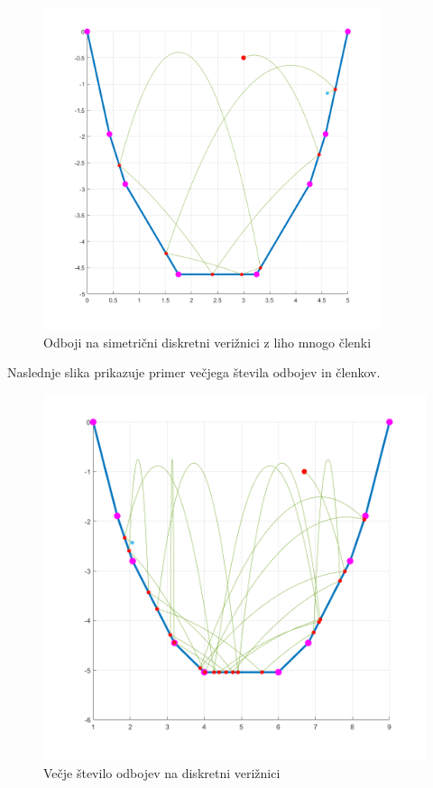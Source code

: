 \documentclass{article}
\begin{document}
\begin{figure}[H]
    \begin{center}
    \includegraphics[width=280pt]{odboji.png}
    \caption{Odboji na simetrični diskretni verižnici z liho mnogo členki}
    \end{center}    
\end{figure}

Naslednje slika prikazuje primer večjega števila odbojev in členkov.

\begin{figure}[H]
    \begin{center}
    \includegraphics[width=320pt]{odboji_vec.png}
    \caption{Večje število odbojev na diskretni verižnici}
    \end{center}    
\end{figure}
\end{document}
